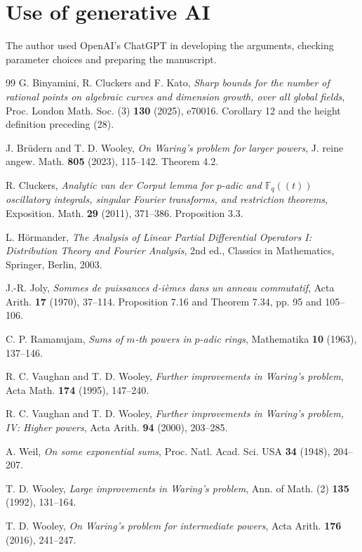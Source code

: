 \documentclass[11pt]{amsart}
\theoremstyle{definition}
\numberwithin{equation}{section}
\begin{document}
\section*{Use of generative AI}
The author used OpenAI's ChatGPT in developing the arguments, checking
parameter choices and preparing the manuscript.
\begin{thebibliography}{99}
G. Binyamini, R. Cluckers and F. Kato,
\emph{Sharp bounds for the number of rational points on algebraic curves and
dimension growth, over all global fields}, Proc. London Math. Soc. (3)
\textbf{130} (2025), e70016. Corollary 12 and the height definition preceding (28).

J. Br\"udern and T. D. Wooley, \emph{On Waring's problem for larger powers},
J. reine angew. Math. \textbf{805} (2023), 115--142. Theorem 4.2.

R. Cluckers, \emph{Analytic van der Corput lemma for $p$-adic and
$\mathbb F_q((t))$ oscillatory integrals, singular Fourier transforms,
and restriction theorems}, Exposition. Math. \textbf{29} (2011), 371--386.
Proposition 3.3.

L. H\"ormander, \emph{The Analysis of Linear Partial Differential
Operators I: Distribution Theory and Fourier Analysis}, 2nd ed.,
Classics in Mathematics, Springer, Berlin, 2003.

J.-R. Joly, \emph{Sommes de puissances $d$-i\`emes dans un anneau commutatif},
Acta Arith. \textbf{17} (1970), 37--114. Proposition 7.16 and
Theorem 7.34, pp. 95 and 105--106.

C. P. Ramanujam, \emph{Sums of $m$-th powers in $p$-adic rings},
Mathematika \textbf{10} (1963), 137--146.

R. C. Vaughan and T. D. Wooley, \emph{Further improvements in Waring's problem},
Acta Math. \textbf{174} (1995), 147--240.

R. C. Vaughan and T. D. Wooley,
\emph{Further improvements in Waring's problem, IV: Higher powers},
Acta Arith. \textbf{94} (2000), 203--285.

A. Weil, \emph{On some exponential sums},
Proc. Natl. Acad. Sci. USA \textbf{34} (1948), 204--207.

T. D. Wooley, \emph{Large improvements in Waring's problem},
Ann. of Math. (2) \textbf{135} (1992), 131--164.

T. D. Wooley, \emph{On Waring's problem for intermediate powers},
Acta Arith. \textbf{176} (2016), 241--247.


\end{thebibliography}
\end{document}
